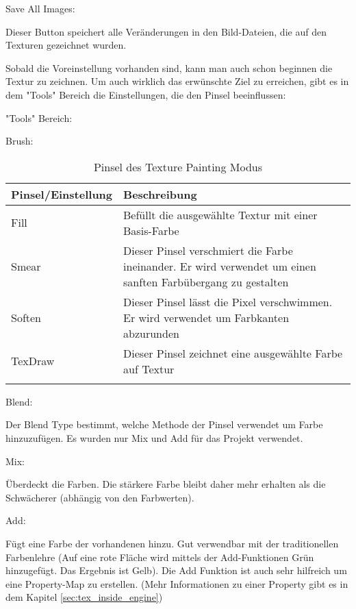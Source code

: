     Save All Images:

    Dieser Button speichert alle Veränderungen in den Bild-Dateien, die auf den Texturen
    gezeichnet wurden.


Sobald die Voreinstellung vorhanden sind, kann man auch schon beginnen die Textur zu zeichnen. Um auch wirklich das
erwünschte Ziel zu erreichen, gibt es in dem "Tools" Bereich die Einstellungen, die den Pinsel beeinflussen:


"Tools" Bereich:

    Brush:
    \begin{longtable}{|p{4cm}|p{9.6cm}|}
        \hline
        \endfirsthead
        \textbf{Pinsel/Einstellung} & \textbf{Beschreibung}\\
        \hline
        \endhead

        Fill & Befüllt die ausgewählte Textur mit einer Basis-Farbe \\
    \hline
        Smear & Dieser Pinsel verschmiert die Farbe ineinander. Er wird verwendet um einen sanften Farbübergang zu gestalten \\
    \hline
        Soften & Dieser Pinsel lässt die Pixel verschwimmen. Er wird verwendet um Farbkanten abzurunden \\
    \hline
        TexDraw & Dieser Pinsel zeichnet eine ausgewählte Farbe auf Textur \\
    \hline

        \caption{Pinsel des Texture Painting Modus}
        \label{table:tex_painting_brushes}
    \end{longtable}

    Blend:

    Der Blend Type bestimmt, welche Methode der Pinsel verwendet um Farbe hinzuzufügen. Es wurden nur Mix und Add für
    das Projekt verwendet.

        Mix:

        Überdeckt die Farben. Die stärkere Farbe bleibt daher mehr erhalten als die Schwächerer
        (abhängig von den Farbwerten).

        Add:

        Fügt eine Farbe der vorhandenen hinzu. Gut verwendbar mit der traditionellen Farbenlehre (Auf eine rote Fläche
        wird mittels der Add-Funktionen Grün hinzugefügt. Das Ergebnis ist Gelb).
        Die Add Funktion ist auch sehr hilfreich um eine Property-Map zu erstellen.
        (Mehr Informationen zu einer Property gibt es in dem Kapitel \ref{sec:tex_inside_engine})



